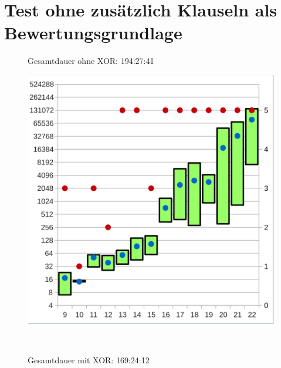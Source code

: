 \section{Test ohne zusätzlich Klauseln als Bewertungsgrundlage}


\begin{figure}[!h]
  \centering
  \begin{minipage}[t]{0.45\textwidth}
  \begin{flushleft}Gesamtdauer ohne XOR: 194:27:41\end{flushleft}
  \includegraphics[scale=0.55]{images/data_base_knf}
  \end{minipage}
  \begin{minipage}[t]{0.09\textwidth}
  ~~
  \end{minipage}
  \begin{minipage}[t]{0.45\textwidth}
  \begin{flushleft}Gesamtdauer mit XOR: 169:24:12\end{flushleft}

\end{minipage}
\end{figure}
